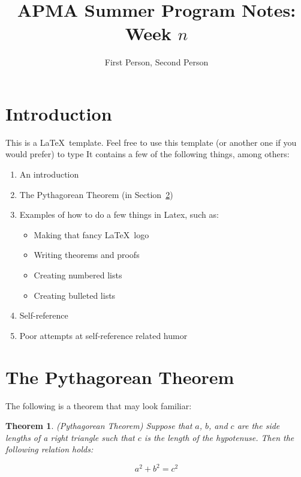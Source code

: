 \documentclass[10pt]{article}         %
\title{APMA Summer Program Notes: Week $n$}
\author{First Person, Second Person}
\newtheorem{theorem}{Theorem}[section]
\begin{document}
\maketitle

\section{Introduction}
\label{sec: introduction}
This is a \LaTeX\ template.  Feel free to use this template (or another one if you would prefer) to type It contains a few of the following things, among others:

\begin{enumerate}[label=(\roman*)]
	\item An introduction
	\item The Pythagorean Theorem (in Section~\ref{sec: pythag})
	\item Examples of how to do a few things in Latex, such as:
	\begin{itemize}
		\item Making that fancy \LaTeX\ logo
		\item Writing theorems and proofs
		\item Creating numbered lists
		\item Creating bulleted lists
	\end{itemize}
	\item Self-reference
	\item Poor attempts at self-reference related humor
\end{enumerate}


\section{The Pythagorean Theorem}
\label{sec: pythag}
The following is a theorem that may look familiar:

\begin{theorem}
(Pythagorean Theorem)  Suppose that $a$, $b$, and $c$ are the side lengths of a right triangle such that $c$ is the length of the hypotenuse.  Then the following relation holds:

$$a^2+b^2=c^2$$
\end{theorem}
\end{document}
